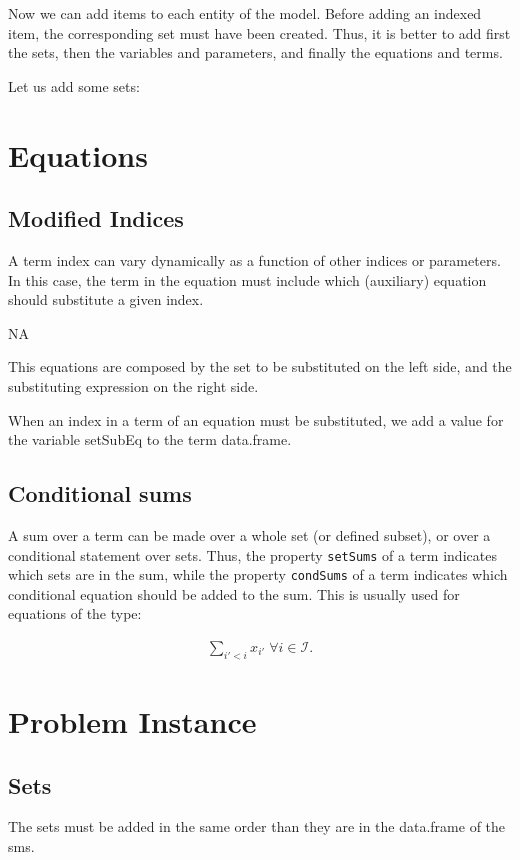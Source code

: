 \documentclass[a4paper]{article}
\begin{document}
Now we can add items to each entity of the model. Before adding an indexed item,
the corresponding set must have been created. Thus, it is better to add first
the sets, then the variables and parameters, and finally the equations and
terms.

Let us add some sets:



\section{Equations}

\subsection{Modified Indices}

A term index can vary dynamically as a function of other indices or parameters.
In this case, the term in the equation must include which (auxiliary) equation
should substitute a given index.

NA

This equations are composed by the set to be substituted on the left side,
and the substituting expression on the right side.

When an index in a term of an equation must be substituted, we add a value for
the variable setSubEq to the term data.frame.

\subsection{Conditional sums}

A sum over a term can be made over a whole set (or defined subset), or over a
conditional statement over sets. Thus, the property \texttt{setSums} of a term
indicates which sets are in the sum, while the property \texttt{condSums} of a
term indicates which conditional equation should be added to the sum. This is
usually used for equations of the type:

\begin{align*}
\sum_{i'<i} x_{i'}\; \forall i \in \mathcal{I}. 
\end{align*}


\section{Problem Instance}

\subsection{Sets}
The sets must be added in the same order than they are in the data.frame of the
sms.
\end{document}
